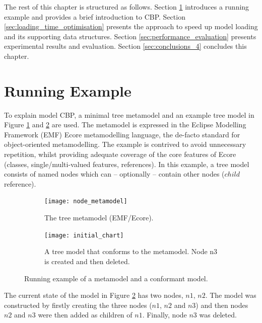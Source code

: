 The rest of this chapter is structured as follows. Section \ref{sec:case_study} introduces a running example and provides a brief introduction to CBP.
Section \ref{sec:loading_time_optimisation} presents the approach to speed up model loading and its supporting data structures. Section \ref{sec:performance_evaluation} presents experimental results and evaluation.  Section \ref{sec:conclusions_4} concludes this chapter.

\section{Running Example}
\label{sec:case_study}
To explain model CBP, a minimal tree metamodel and an example tree model in Figure \ref{fig:tree_metamodel} and \ref{fig:initial_model} are used.
The metamodel is expressed in the Eclipse Modelling Framework (EMF) Ecore metamodelling language, the de-facto standard for object-oriented metamodelling.  The example is contrived to avoid unnecessary repetition, whilst providing adequate coverage of the core features of Ecore (classes, single/multi-valued features, references).
In this example, a tree model consists of named nodes which can -- optionally -- contain other nodes ($child$ reference).

\begin{figure}[ht]
\begin{subfigure}[t]{0.3\linewidth}
\centering
\texttt{[image: node\_metamodel]}
\caption{The tree metamodel (EMF/Ecore).}
\label{fig:tree_metamodel}
\end{subfigure}
\hfill
\begin{subfigure}[t]{0.7\linewidth}
\centering
\texttt{[image: initial\_chart]}
\caption{A tree model that conforms to the  metamodel.  Node n3 is created and then deleted.}
\label{fig:initial_model}
\end{subfigure}
\caption{Running example of a metamodel and a conformant model.}
\label{fig:append_speed}
\end{figure}

The current state of the model in Figure \ref{fig:initial_model} has two nodes, $n1$, $n2$.  The model was constructed by firstly creating the three nodes ($n1$, $n2$ and $n3$) and then nodes $n2$ and $n3$ were then added as children of $n1$. Finally, node $n3$ was deleted.

